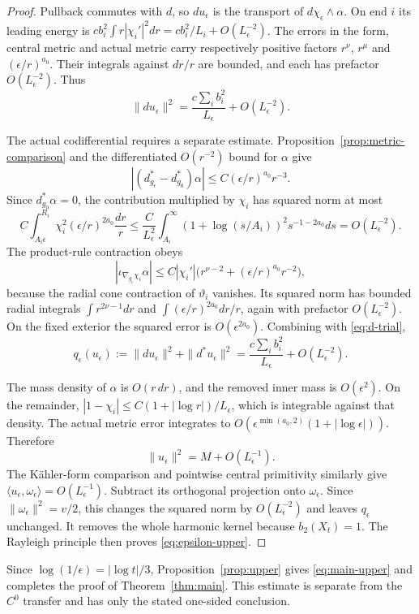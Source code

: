 \begin{proof}
Pullback commutes with $d$, so $du_\epsilon$ is the transport of
$d\chi_\epsilon\wedge\alpha$. On end $i$ its leading energy is
$c b_i^2\int r|\chi_i'|^2dr=c b_i^2/L_i+O(L_\epsilon^{-2})$.
The errors in the form, central metric and actual metric carry respectively
positive factors $r^\nu$, $r^\mu$ and $(\epsilon/r)^{a_0}$.
Their integrals against $dr/r$ are bounded, and each has prefactor
$O(L_\epsilon^{-2})$. Thus
\begin{equation}\label{eq:d-trial}
 \|du_\epsilon\|^2=\frac{c\sum_i b_i^2}{L_\epsilon}
 +O(L_\epsilon^{-2}).
\end{equation}

The actual codifferential requires a separate estimate.
Proposition~\ref{prop:metric-comparison} and the differentiated
$O(r^{-2})$ bound for $\alpha$ give
\[
 |(d^*_{g_\epsilon}-d^*_{g_0})\alpha|
 \le C(\epsilon/r)^{a_0}r^{-3}.
\]
Since $d^*_{g_0}\alpha=0$, the contribution multiplied by $\chi_i$
has squared norm at most
\[
 C\int_{A_i\epsilon}^{R_i}\chi_i^2(\epsilon/r)^{2a_0}\frac{dr}{r}
 \le \frac C{L_\epsilon^2}
 \int_{A_i}^{\infty}(1+\log(s/A_i))^2s^{-1-2a_0}ds
 =O(L_\epsilon^{-2}).
\]
The product-rule contraction obeys
\[
 |\iota_{\nabla_{g_\epsilon}\chi_i}\alpha|
 \le C|\chi_i'|\bigl(r^{\nu-2}+(\epsilon/r)^{a_0}r^{-2}\bigr),
\]
because the radial cone contraction of $\vartheta_i$ vanishes.
Its squared norm has bounded radial integrals
$\int r^{2\nu-1}dr$ and $\int(\epsilon/r)^{2a_0}dr/r$, again with
prefactor $O(L_\epsilon^{-2})$. On the fixed exterior the squared
error is $O(\epsilon^{2a_0})$. Combining with \eqref{eq:d-trial},
\begin{equation}\label{eq:q-trial}
 q_\epsilon(u_\epsilon):=\|du_\epsilon\|^2+\|d^*u_\epsilon\|^2
 =\frac{c\sum_i b_i^2}{L_\epsilon}+O(L_\epsilon^{-2}).
\end{equation}

The mass density of $\alpha$ is $O(r\,dr)$, and the removed inner
mass is $O(\epsilon^2)$. On the remainder,
$|1-\chi_i|\le C(1+|\log r|)/L_\epsilon$, which is integrable
against that density. The actual metric error integrates to
$O(\epsilon^{\min(a_0,2)}(1+|\log\epsilon|))$. Therefore
\[
 \|u_\epsilon\|^2=M+O(L_\epsilon^{-1}).
\]
The K\"ahler-form comparison and pointwise central primitivity similarly
give $\langle u_\epsilon,\omega_\epsilon\rangle=O(L_\epsilon^{-1})$.
Subtract its orthogonal projection onto $\omega_\epsilon$.
Since $\|\omega_\epsilon\|^2=v/2$, this changes the squared norm by
$O(L_\epsilon^{-2})$ and leaves $q_\epsilon$ unchanged. It removes
the whole harmonic kernel because $b_2(X_t)=1$. The Rayleigh principle
then proves \eqref{eq:epsilon-upper}.
\end{proof}

Since $\log(1/\epsilon)=|\log t|/3$, Proposition~\ref{prop:upper}
gives \eqref{eq:main-upper} and completes the proof of
Theorem~\ref{thm:main}. This estimate is separate from the $C^0$ transfer
and has only the stated one-sided conclusion.

